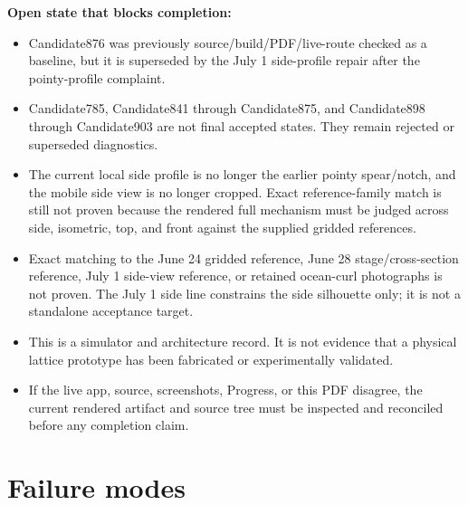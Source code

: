 \documentclass[12pt,letterpaper]{article}
\begin{document}
\textbf{Open state that blocks completion:}
\begin{itemize}
  \item Candidate876 was previously source/build/PDF/live-route checked as a baseline, but it is superseded by the July 1 side-profile repair after the pointy-profile complaint.
  \item Candidate785, Candidate841 through Candidate875, and Candidate898 through Candidate903 are not final accepted states. They remain rejected or superseded diagnostics.
  \item The current local side profile is no longer the earlier pointy spear/notch, and the mobile side view is no longer cropped. Exact reference-family match is still not proven because the rendered full mechanism must be judged across side, isometric, top, and front against the supplied gridded references.
  \item Exact matching to the June 24 gridded reference, June 28 stage/cross-section reference, July 1 side-view reference, or retained ocean-curl photographs is not proven. The July 1 side line constrains the side silhouette only; it is not a standalone acceptance target.
  \item This is a simulator and architecture record. It is not evidence that a physical lattice prototype has been fabricated or experimentally validated.
  \item If the live app, source, screenshots, Progress, or this PDF disagree, the current rendered artifact and source tree must be inspected and reconciled before any completion claim.
\end{itemize}

\section{Failure modes}
\end{document}
